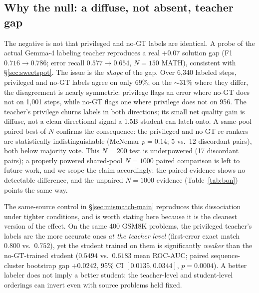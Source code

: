 \documentclass{article}
\begin{document}
\subsection{Why the null: a diffuse, not absent, teacher gap}
\label{sec:diffuse}
The negative is not that privileged and no-GT labels are identical. A probe
of the actual Gemma-4 labeling teacher reproduces a real $+0.07$
solution gap (F1 $0.716 \to 0.786$; error recall $0.577 \to 0.654$, $N=150$
MATH), consistent with \S\ref{sec:sweetspot}. The issue is the
\emph{shape} of the gap. Over 6{,}340 labeled steps, privileged and no-GT
labels agree on only $69\%$; on the $\sim 31\%$ where they differ, the
disagreement is nearly symmetric: privilege flags an error where no-GT does
not on 1{,}001 steps, while no-GT flags one where privilege does not on
956. The teacher's privilege churns labels in both directions; its small net
quality gain is diffuse, not a clean directional signal a 1.5B student can
latch onto. A same-pool paired best-of-$N$ confirms the consequence: the
privileged and no-GT re-rankers are statistically indistinguishable
(McNemar $p=0.14$; 5 vs.\ 12 discordant pairs), both below majority vote.
This $N=200$ test is underpowered (17 discordant pairs); a properly powered
shared-pool $N=1000$ paired comparison is left to future work, and we scope
the claim accordingly: the paired evidence shows no detectable difference, and
the unpaired $N=1000$ evidence (Table~\ref{tab:bon}) points the same way.

The same-source control in \S\ref{sec:mismatch-main} reproduces this
dissociation under tighter conditions, and is worth stating here because it
is the cleanest version of the effect. On the same 400 GSM8K problems, the
privileged teacher's labels are the more accurate ones \emph{at the teacher
level} (first-error exact match $0.800$ vs.\ $0.752$), yet the student trained
on them is significantly \emph{weaker} than the no-GT-trained student
($0.5494$ vs.\ $0.6183$ mean ROC-AUC; paired sequence-cluster bootstrap gap
$+0.0242$, 95\% CI $[0.0135, 0.0344]$, $p=0.0004$). A better labeler does not
imply a better student: the teacher-level and student-level orderings can
invert even with source problems held fixed.
\end{document}
